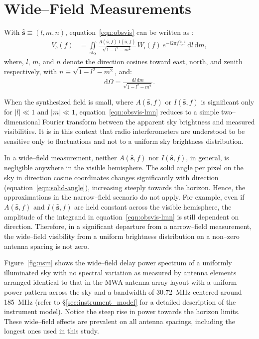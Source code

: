 \documentclass[preprint2,iop,numberedappendix,twocolappendix,appendixfloats]{emulateapj}
\newcommand{\dif}{\mathrm{d}}
\begin{document}
\section{Wide--Field Measurements}\label{sec:wide-field}

With $\hat{\boldsymbol{s}}\equiv (l,m,n)$, equation~\ref{eqn:obsvis} can be written as \citep{tay99,tho01}:
\begin{align}\label{eqn:obsvis-lmn}
  V_b(f) &= \iint\limits_\textrm{sky} \frac{A(\hat{\boldsymbol{s}},f)\,I(\hat{\boldsymbol{s}},f)}{\sqrt{1-l^2-m^2}}\,W_\textrm{i}(f)\,e^{-i2\pi f\frac{\boldsymbol{b}\cdot\hat{\boldsymbol{s}}}{c}}\,\dif l\,\dif m, 
\end{align}
where, $l$, $m$, and $n$ denote the direction cosines toward east, north, and zenith respectively, with $n\equiv\sqrt{1-l^2-m^2}$, and:
\begin{align}\label{eqn:solid-angle}
  \dif\Omega = \frac{\dif l\,\dif m}{\sqrt{1-l^2-m^2}}.
\end{align}

When the synthesized field is small, where $A(\hat{\boldsymbol{s}},f)$ or $I(\hat{\boldsymbol{s}},f)$ is significant only for $|l| \ll 1$ and $|m| \ll 1$, equation~\ref{eqn:obsvis-lmn} reduces to a simple two--dimensional Fourier transform \citep{tay99,tho01} between the apparent sky brightness and measured visibilities. It is in this context that radio interferometers are understood to be sensitive only to fluctuations and not to a uniform sky brightness distribution. 

In a wide--field measurement, neither $A(\hat{\boldsymbol{s}},f)$ nor $I(\hat{\boldsymbol{s}},f)$, in general, is negligible anywhere in the visible hemisphere. The solid angle per pixel on the sky in direction cosine coordinates changes significantly with direction (equation~\ref{eqn:solid-angle}), increasing steeply towards the horizon. Hence, the approximations in the narrow--field scenario do not apply. For example, even if $A(\hat{\boldsymbol{s}},f)$ and $I(\hat{\boldsymbol{s}},f)$ are held constant across the visible hemisphere, the amplitude of the integrand in equation~\ref{eqn:obsvis-lmn} is still dependent on direction. Therefore, in a significant departure from a narrow--field measurement, the wide--field visibility from a uniform brightness distribution on a non--zero antenna spacing is not zero.

Figure~\ref{fig:usm} shows the wide--field delay power spectrum of a uniformly illuminated sky with no spectral variation as measured by antenna elements arranged identical to that in the MWA antenna array layout \citep{bea12} with a uniform power pattern across the sky and a bandwidth of 30.72~MHz centered around 185~MHz (refer to \S\ref{sec:instrument_model} for a detailed description of the instrument model). Notice the steep rise in power towards the horizon limits. These wide--field effects are prevalent on all antenna spacings, including the longest ones used in this study. 
\end{document}
